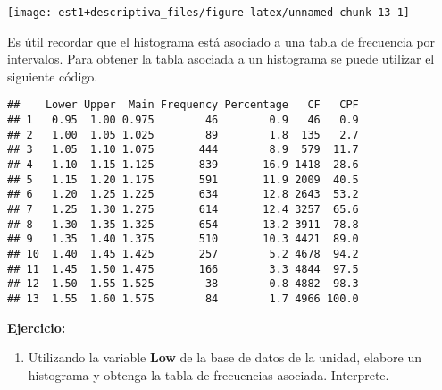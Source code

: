 \documentclass[
]{book}
\newenvironment{Shaded}{\begin{snugshade}}{\end{snugshade}}
\newcommand{\AttributeTok}[1]{\textcolor[rgb]{0.77,0.63,0.00}{#1}}
\newcommand{\CommentTok}[1]{\textcolor[rgb]{0.56,0.35,0.01}{\textit{#1}}}
\newcommand{\DecValTok}[1]{\textcolor[rgb]{0.00,0.00,0.81}{#1}}
\newcommand{\FunctionTok}[1]{\textcolor[rgb]{0.00,0.00,0.00}{#1}}
\newcommand{\NormalTok}[1]{#1}
\newcommand{\OtherTok}[1]{\textcolor[rgb]{0.56,0.35,0.01}{#1}}
\newcommand{\SpecialCharTok}[1]{\textcolor[rgb]{0.00,0.00,0.00}{#1}}
\providecommand{\tightlist}{%
  \setlength{\itemsep}{0pt}\setlength{\parskip}{0pt}}
\begin{document}
\begin{center}\texttt{[image: est1+descriptiva\_files/figure-latex/unnamed-chunk-13-1]} \end{center}

Es útil recordar que el histograma está asociado a una tabla de frecuencia por intervalos. Para obtener la tabla asociada a un histograma se puede utilizar el siguiente código.

\begin{Shaded}
\end{Shaded}

\begin{verbatim}
##    Lower Upper  Main Frequency Percentage   CF   CPF
## 1   0.95  1.00 0.975        46        0.9   46   0.9
## 2   1.00  1.05 1.025        89        1.8  135   2.7
## 3   1.05  1.10 1.075       444        8.9  579  11.7
## 4   1.10  1.15 1.125       839       16.9 1418  28.6
## 5   1.15  1.20 1.175       591       11.9 2009  40.5
## 6   1.20  1.25 1.225       634       12.8 2643  53.2
## 7   1.25  1.30 1.275       614       12.4 3257  65.6
## 8   1.30  1.35 1.325       654       13.2 3911  78.8
## 9   1.35  1.40 1.375       510       10.3 4421  89.0
## 10  1.40  1.45 1.425       257        5.2 4678  94.2
## 11  1.45  1.50 1.475       166        3.3 4844  97.5
## 12  1.50  1.55 1.525        38        0.8 4882  98.3
## 13  1.55  1.60 1.575        84        1.7 4966 100.0
\end{verbatim}

\textbf{Ejercicio:}

\begin{enumerate}
\def\labelenumi{\arabic{enumi}.}
\tightlist
\item
  Utilizando la variable \textbf{Low} de la base de datos de la unidad, elabore un histograma y obtenga la tabla de frecuencias asociada. Interprete.
\end{enumerate}
\end{document}
